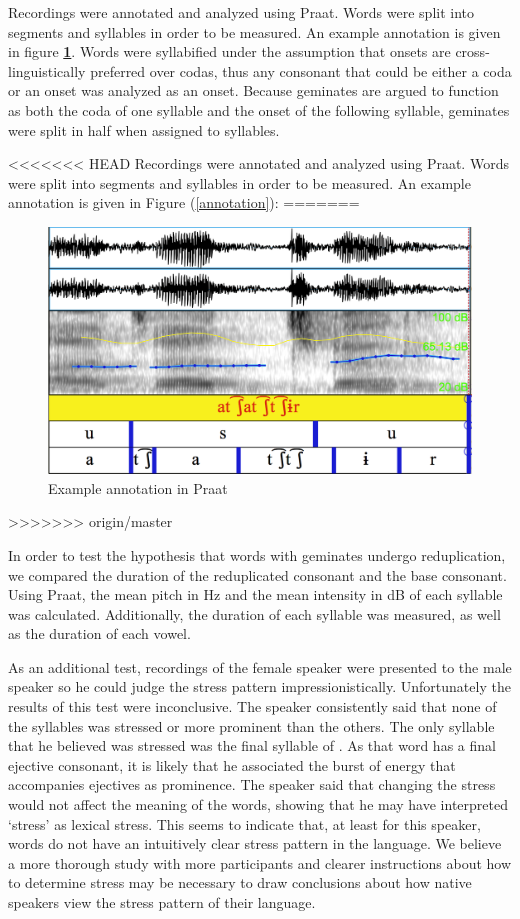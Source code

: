 \documentclass[12pt]{article}
\begin{document}
Recordings were annotated and analyzed using Praat. Words were split into segments and syllables in order to be measured. An example annotation is given in figure \textbf{\ref{fig:annotate}}. Words were syllabified under the assumption that onsets are cross-linguistically preferred over codas, thus any consonant that could be either a coda or an onset was analyzed as an onset. Because geminates are argued to function as both the coda of one syllable and the onset of the following syllable, geminates were split in half when assigned to syllables.

<<<<<<< HEAD
Recordings were annotated and analyzed using Praat. Words were split into segments and syllables in order to be measured. An example annotation is given in Figure (\ref{annotation}):
=======
\begin{figure}[h]
	\centering
	\caption{Example annotation in Praat \label{fig:annotate}}
	\includegraphics[width=.8\textwidth]{exann.png}
\end{figure}
>>>>>>> origin/master

In order to test the hypothesis that words with geminates undergo reduplication, we compared the duration of the reduplicated consonant and the base consonant. Using Praat, the mean pitch in Hz and the mean intensity in dB of each syllable was calculated. Additionally, the duration of each syllable was measured, as well as the duration of each vowel. 

As an additional test, recordings of the female speaker were presented to the male speaker so he could judge the stress pattern impressionistically. Unfortunately the results of this test were inconclusive. The speaker consistently said that none of the syllables was stressed or more prominent than the others. The only syllable that he believed was stressed was the final syllable of \emph{}. As that word has a final ejective consonant, it is likely that he associated the burst of energy that accompanies ejectives as prominence. The speaker said that changing the stress would not affect the meaning of the words, showing that he may have interpreted `stress' as lexical stress. This seems to indicate that, at least for this speaker, words do not have an intuitively clear stress pattern in the language. We believe a more thorough study with more participants and clearer instructions about how to determine stress may be necessary to draw conclusions about how native speakers view the stress pattern of their language. 
\end{document}
